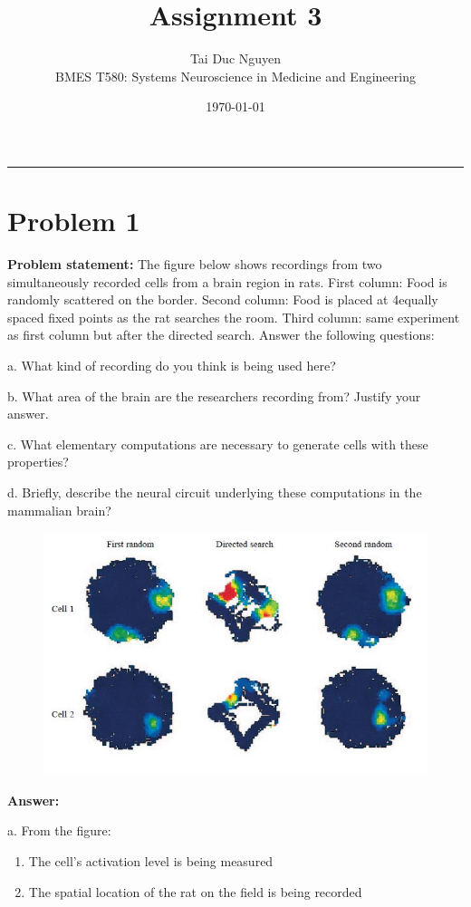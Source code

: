 \documentclass[letterpaper, 11pt]{article}
\title{Assignment 3}
\author{
Tai Duc Nguyen \\
BMES T580: Systems Neuroscience in Medicine and Engineering
}
\date{\today}
\begin{document}
\maketitle

\rule{\textwidth}{1pt}

\section{Problem 1}
\label{sec:prob1}
\textbf{Problem statement:} The figure below shows recordings from two simultaneously recorded cells from a brain region in rats. First column: Food is randomly scattered on the border. Second column: Food is placed at 4equally spaced fixed points as the rat searches the room. Third column: same experiment as first column but after the directed search. Answer the following questions:

a. What kind of recording do you think is being used here?

b. What area of the brain are the researchers recording from? Justify your answer.

c. What elementary computations are necessary to generate cells with these properties?

d. Briefly, describe the neural circuit underlying these computations in the mammalian brain?

\begin{figure}[htb!]
	\centering
	\includegraphics[width=0.8\linewidth]{fig1.png}
	\label{fig1}
\end{figure}

\textbf{Answer:}

a. From the figure:

\begin{enumerate}
	\item The cell's activation level is being measured
	\item The spatial location of the rat on the field is being recorded
\end{enumerate}
\end{document}
